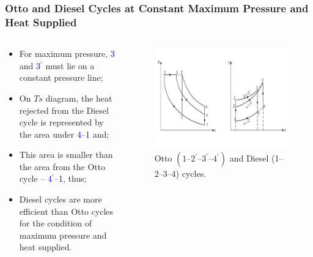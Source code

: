 \documentclass[10pt,compress]{beamer}
\begin{document}
\begin{frame}
 \frametitle{Otto and Diesel Cycles at Constant Maximum Pressure and Heat Supplied}
  \begin{columns}
   \begin{column}[c]{0.4\linewidth}
    \begin{itemize}
     \item <1-> For maximum pressure, \textcolor{blue}{3} and \textcolor{blue}{3$^{\prime}$} must lie on a constant pressure line;
     \item <2-> On $Ts$ diagram, the heat rejected from the Diesel cycle is represented by the area under \textcolor{blue}{4--1} and;
     \item <3-> This area is smaller than the area from the Otto cycle -- \textcolor{blue}{4$^{\prime}$--1}, thus;
     \item <4-> Diesel cycles are more efficient than Otto cycles for the condition of maximum pressure and heat supplied.
    \end{itemize}
   \end{column}
   \begin{column}[c]{0.6\linewidth}
    \begin{figure}%
     \begin{center}
      \includegraphics[width=7.cm,clip]{./Pics/InternalCombustion_Comparison3}
      \caption{Otto $\left(\text{1--2}^{\prime}\text{--3}^{\prime}\text{--4}^{\prime}\right)$ and Diesel (1--2--3--4) cycles.}
     \end{center}
    \end{figure}   
   \end{column}  
  \end{columns}
\end{frame}
\end{document}
